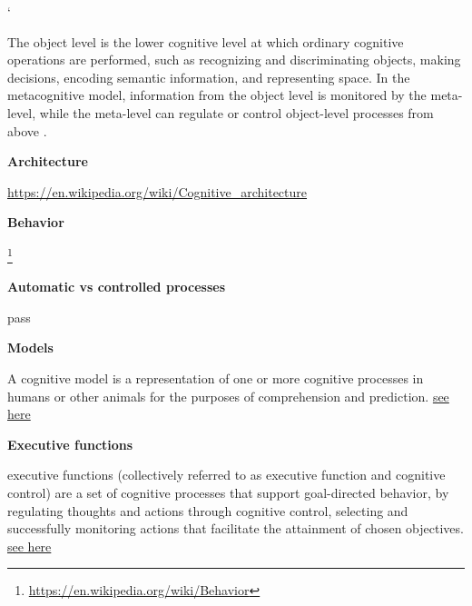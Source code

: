 \documentclass{book}
\newcommand{\seehere}[1]{\href{#1}{see here}}
\providecommand{\ProjectDeepHeading}[2]{%
    \par\medskip\noindent\textbf{#2}\par\smallskip
}
\providecommand{\seehere}[1]{\href{#1}{see here}}
\providecommand{\seeherefooter}[1]{\footnote{\url{#1}}}
\begin{document}
% 


`


The object level is the lower cognitive level at which ordinary cognitive operations are performed, such as recognizing and discriminating objects, making decisions, encoding semantic information, and representing space. In the metacognitive model, information from the object level is monitored by the meta-level, while the meta-level can regulate or control object-level processes from above \cite{fleur-2021-metacognition-ideas-and-insights-from-neuro-and-educational-scie}.

\ProjectDeepHeading{1}{Architecture}


\url{https://en.wikipedia.org/wiki/Cognitive_architecture}

\ProjectDeepHeading{1}{Behavior}


\seeherefooter{https://en.wikipedia.org/wiki/Behavior}


\ProjectDeepHeading{4}{Automatic vs controlled processes}
    pass

\ProjectDeepHeading{2}{Models}


A cognitive model is a representation of one or more cognitive processes in humans or other animals for the purposes of comprehension and prediction.
    \seehere{https://en.wikipedia.org/wiki/Cognitive_model}

\ProjectDeepHeading{3}{Executive functions}


executive functions (collectively referred to as executive function and cognitive control) are a set of cognitive processes that support goal-directed behavior, by regulating thoughts and actions through cognitive control, selecting and successfully monitoring actions that facilitate the attainment of chosen objectives.
    \seehere{https://en.wikipedia.org/wiki/Executive_functions}
\end{document}
